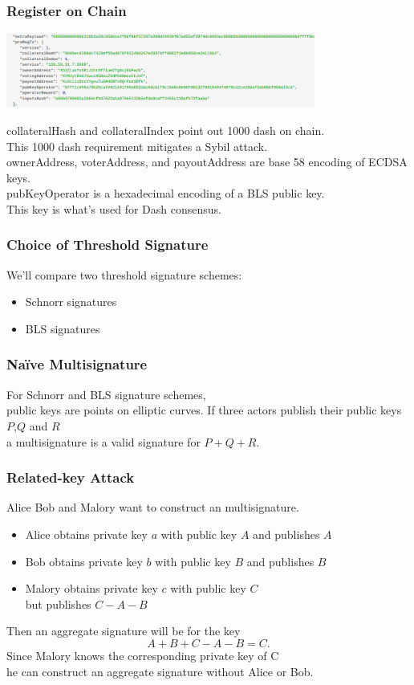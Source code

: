 \documentclass[english,handout]{beamer}
\begin{document}
\begin{frame}
\frametitle{Register on Chain}

\begin{center}
\includegraphics[width=4in]{extra_payload.png}
\end{center}
\pause
collateralHash and collateralIndex point out 1000 dash on chain.\\
\pause
This 1000 dash requirement mitigates a Sybil attack. \\
\pause
ownerAddress, voterAddress, and payoutAddress are base 58 encoding of ECDSA keys.\\
\pause
pubKeyOperator is a hexadecimal encoding of a BLS public key. \\
\pause
This key is what's used for Dash consensus.
\end{frame}

\begin{frame}
\frametitle{Choice of Threshold Signature}

We'll compare two threshold signature schemes:

\begin{itemize}
\item Schnorr signatures
\item BLS signatures
\end{itemize}
\end{frame}

\begin{frame}
\frametitle{Na\"ive Multisignature}
\vfill
For Schnorr and BLS signature schemes, \\
public keys are points on elliptic curves.
\pause
\vfill
If three actors publish their public keys $P$,$Q$ and $R$ \\
a multisignature is a valid signature for $P+Q+R$.
\vfill

\end{frame}

\begin{frame}
\frametitle{Related-key Attack}

Alice Bob and Malory want to construct an multisignature.  \\
\pause
\begin{itemize}
\item Alice obtains private key $a$ with public key $A$ and publishes $A$
\item Bob obtains private key $b$ with public key $B$ and publishes $B$
\pause
\item Malory obtains private key $c$ with public key $C$ \\
but publishes $C-A-B$
\end{itemize}
\pause
Then an aggregate signature will be for the key
\[
A+B+C-A-B = C.
\]
\pause
Since Malory knows the corresponding private key of C \\
he can construct an aggregate signature without Alice or Bob.
\end{frame}
\end{document}
